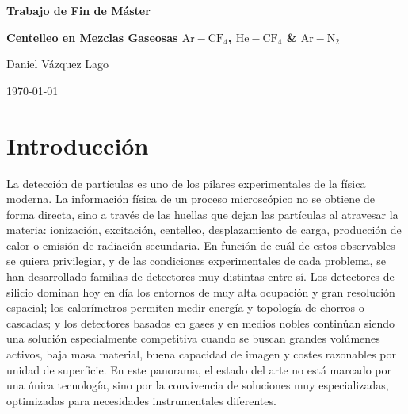 \documentclass[12pt,a4paper]{article}
\newcommand{\N}{\mathrm{N}}
\newcommand{\He}{\mathrm{He}}
\newcommand{\Ar}{\mathrm{Ar}}
\newcommand{\CF}{\mathrm{CF}}
\begin{document}

\thispagestyle{empty}
\begin{titlepage}
    \centering
    \vspace*{0.20\textheight}

    {\Huge\bfseries Trabajo de Fin de Máster\par}
    \vspace{2.2em}

    {\LARGE\bfseries Centelleo en Mezclas Gaseosas $\Ar-\CF_4$,  $\He-\CF_4$ \& $\Ar-\N_2$\par}
    \vspace{5em}

    {\Large Daniel Vázquez Lago\par}
    \vspace{2.2em}

    {\Large \today\par}
\end{titlepage}

\pagestyle{empty}
\tableofcontents
\clearpage

\setlength{\parindent}{0pt}
\setlength{\parskip}{0.45em}

\pagestyle{fancy}

\section{Introducción}

La detección de partículas es uno de los pilares experimentales de la física moderna. La información física de un proceso microscópico no se obtiene de forma directa, sino a través de las huellas que dejan las partículas al atravesar la materia: ionización, excitación, centelleo, desplazamiento de carga, producción de calor o emisión de radiación secundaria. En función de cuál de estos observables se quiera privilegiar, y de las condiciones experimentales de cada problema, se han desarrollado familias de detectores muy distintas entre sí. Los detectores de silicio dominan hoy en día los entornos de muy alta ocupación y gran resolución espacial; los calorímetros permiten medir energía y topología de chorros o cascadas; y los detectores basados en gases y en medios nobles continúan siendo una solución especialmente competitiva cuando se buscan grandes volúmenes activos, baja masa material, buena capacidad de imagen y costes razonables por unidad de superficie. En este panorama, el estado del arte no está marcado por una única tecnología, sino por la convivencia de soluciones muy especializadas, optimizadas para necesidades instrumentales diferentes.
\end{document}
